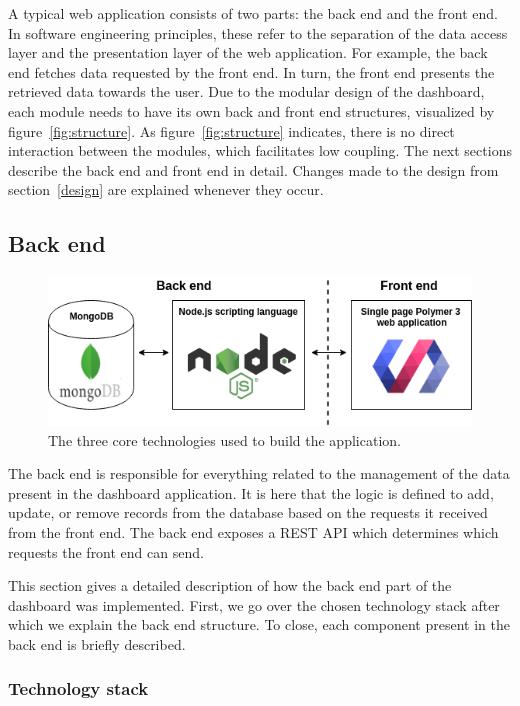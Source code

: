     A typical web application consists of two parts: the back end and the front end. In software engineering principles, these refer to the separation of the data access layer and the presentation layer of the web application. For example, the back end fetches data requested by the front end. In turn, the front end presents the retrieved data towards the user. Due to the modular design of the dashboard, each module needs to have its own back and front end structures, visualized by figure~\ref{fig:structure}. As figure~\ref{fig:structure} indicates, there is no direct interaction between the modules, which facilitates low coupling. The next sections describe the back end and front end in detail. Changes made to the design from section~\ref{design} are explained whenever they occur.

    \subsection{Back end}

    \begin{figure}[t]
        \centering
        \includegraphics[width=1\textwidth]{chapters/4_implementation/tech}
        \caption{The three core technologies used to build the application.}\label{fig:tech}
    \end{figure}

    The back end is responsible for everything related to the management of the data present in the dashboard application. It is here that the logic is defined to add, update, or remove records from the database based on the requests it received from the front end. The back end exposes a REST API which determines which requests the front end can send.

    This section gives a detailed description of how the back end part of the dashboard was implemented. First, we go over the chosen technology stack after which we explain the back end structure. To close, each component present in the back end is briefly described.

        \subsubsection{Technology stack}

